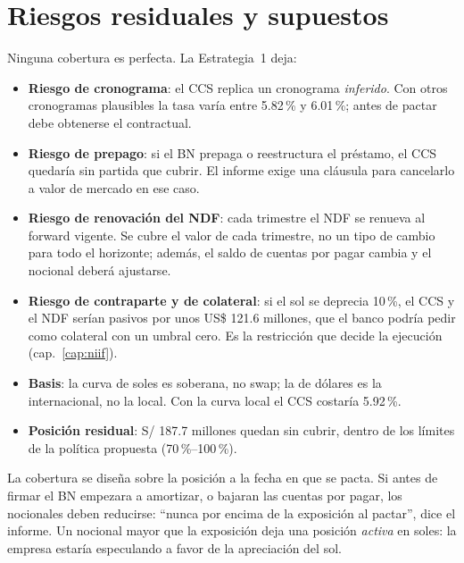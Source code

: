 \section{Riesgos residuales y supuestos}

Ninguna cobertura es perfecta. La Estrategia~1 deja:
\begin{itemize}
\item \textbf{Riesgo de cronograma}: el CCS replica un cronograma \emph{inferido}. Con otros cronogramas plausibles la tasa varía entre 5.82\,\% y 6.01\,\%; antes de pactar debe obtenerse el contractual.
\item \textbf{Riesgo de prepago}: si el BN prepaga o reestructura el préstamo, el CCS quedaría sin partida que cubrir. El informe exige una cláusula para cancelarlo a valor de mercado en ese caso.
\item \textbf{Riesgo de renovación del NDF}: cada trimestre el NDF se renueva al forward vigente. Se cubre el valor de cada trimestre, no un tipo de cambio para todo el horizonte; además, el saldo de cuentas por pagar cambia y el nocional deberá ajustarse.
\item \textbf{Riesgo de contraparte y de colateral}: si el sol se deprecia 10\,\%, el CCS y el NDF serían pasivos por unos US\$ 121.6 millones, que el banco podría pedir como colateral con un umbral cero. Es la restricción que decide la ejecución (cap.~\ref{cap:niif}).
\item \textbf{Basis}: la curva de soles es soberana, no swap; la de dólares es la internacional, no la local. Con la curva local el CCS costaría 5.92\,\%.
\item \textbf{Posición residual}: S/ 187.7 millones quedan sin cubrir, dentro de los límites de la política propuesta (70\,\%--100\,\%).
\end{itemize}

\begin{cuidado}
La cobertura se diseña sobre la posición a la fecha en que se pacta. Si antes de firmar el BN empezara a amortizar, o bajaran las cuentas por pagar, los nocionales deben reducirse: \enquote{nunca por encima de la exposición al pactar}, dice el informe. Un nocional mayor que la exposición deja una posición \emph{activa} en soles: la empresa estaría especulando a favor de la apreciación del sol.
\end{cuidado}

